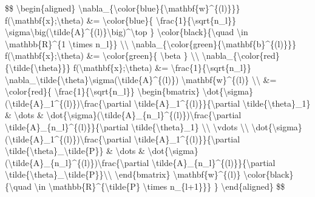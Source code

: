 \$\$ \textbackslash begin\{aligned\} \textbackslash nabla\_\{\textbackslash color\{blue\}\{\textbackslash mathbf\{w\}\^{}\{(l)\}\}\} f(\textbackslash mathbf\{x\};\textbackslash theta) \&= \textbackslash color\{blue\}\{ \textbackslash frac\{1\}\{\textbackslash sqrt\{n\_l\}\} \textbackslash sigma\textbackslash big(\textbackslash tilde\{A\}\^{}\{(l)\}\textbackslash big)\^{}\textbackslash top \} \textbackslash color\{black\}\{\textbackslash quad \textbackslash in \textbackslash mathbb\{R\}\^{}\{1 \textbackslash times n\_l\}\} \textbackslash\textbackslash{} \textbackslash nabla\_\{\textbackslash color\{green\}\{\textbackslash mathbf\{b\}\^{}\{(l)\}\}\} f(\textbackslash mathbf\{x\};\textbackslash theta) \&= \textbackslash color\{green\}\{ \textbackslash beta \} \textbackslash\textbackslash{} \textbackslash nabla\_\{\textbackslash color\{red\}\{\textbackslash tilde\{\textbackslash theta\}\}\} f(\textbackslash mathbf\{x\};\textbackslash theta) \&= \textbackslash frac\{1\}\{\textbackslash sqrt\{n\_l\}\} \textbackslash nabla\_\textbackslash tilde\{\textbackslash theta\}\textbackslash sigma(\textbackslash tilde\{A\}\^{}\{(l)\}) \textbackslash mathbf\{w\}\^{}\{(l)\} \textbackslash\textbackslash{} \&= \textbackslash color\{red\}\{ \textbackslash frac\{1\}\{\textbackslash sqrt\{n\_l\}\} \textbackslash begin\{bmatrix\} \textbackslash dot\{\textbackslash sigma\}(\textbackslash tilde\{A\}\_1\^{}\{(l)\})\textbackslash frac\{\textbackslash partial \textbackslash tilde\{A\}\_1\^{}\{(l)\}\}\{\textbackslash partial \textbackslash tilde\{\textbackslash theta\}\_1\} \& \textbackslash dots \& \textbackslash dot\{\textbackslash sigma\}(\textbackslash tilde\{A\}\_\{n\_l\}\^{}\{(l)\})\textbackslash frac\{\textbackslash partial \textbackslash tilde\{A\}\_\{n\_l\}\^{}\{(l)\}\}\{\textbackslash partial \textbackslash tilde\{\textbackslash theta\}\_1\} \textbackslash\textbackslash{} \textbackslash vdots \textbackslash\textbackslash{} \textbackslash dot\{\textbackslash sigma\}(\textbackslash tilde\{A\}\_1\^{}\{(l)\})\textbackslash frac\{\textbackslash partial \textbackslash tilde\{A\}\_1\^{}\{(l)\}\}\{\textbackslash partial \textbackslash tilde\{\textbackslash theta\}\_\textbackslash tilde\{P\}\} \& \textbackslash dots \& \textbackslash dot\{\textbackslash sigma\}(\textbackslash tilde\{A\}\_\{n\_l\}\^{}\{(l)\})\textbackslash frac\{\textbackslash partial \textbackslash tilde\{A\}\_\{n\_l\}\^{}\{(l)\}\}\{\textbackslash partial \textbackslash tilde\{\textbackslash theta\}\_\textbackslash tilde\{P\}\}\textbackslash\textbackslash{} \textbackslash end\{bmatrix\} \textbackslash mathbf\{w\}\^{}\{(l)\} \textbackslash color\{black\}\{\textbackslash quad \textbackslash in \textbackslash mathbb\{R\}\^{}\{\textbackslash tilde\{P\} \textbackslash times n\_\{l+1\}\}\} \} \textbackslash end\{aligned\} \$\$

